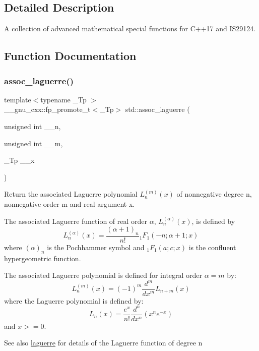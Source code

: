 \subsection{Detailed Description}
A collection of advanced mathematical special functions for C++17 and I\+S29124. 

\subsection{Function Documentation}
\mbox{\label{group__mathsf__std_ga0b33e0ac3066f2353861ce2f34b43f57}} 
\subsubsection{\texorpdfstring{assoc\+\_\+laguerre()}{assoc\_laguerre()}\hspace{0.1cm}{\footnotesize\ttfamily [1/2]}}
{\footnotesize\ttfamily template$<$typename \+\_\+\+Tp $>$ \\
\+\_\+\+\_\+gnu\+\_\+cxx\+::fp\+\_\+promote\+\_\+t$<$\+\_\+\+Tp$>$ std\+::assoc\+\_\+laguerre (\begin{DoxyParamCaption}\item[{unsigned int}]{\+\_\+\+\_\+n,  }\item[{unsigned int}]{\+\_\+\+\_\+m,  }\item[{\+\_\+\+Tp}]{\+\_\+\+\_\+x }\end{DoxyParamCaption})\hspace{0.3cm}{\ttfamily [inline]}}

Return the associated Laguerre polynomial $ L_n^{(m)}(x) $ of nonnegative degree {\ttfamily n}, nonnegative order {\ttfamily m} and real argument {\ttfamily x}.

The associated Laguerre function of real order $ \alpha $, $ L_n^{(\alpha)}(x) $, is defined by \[ L_n^{(\alpha)}(x) = \frac{(\alpha + 1)_n}{n!} {}_1F_1(-n; \alpha + 1; x) \] where $ (\alpha)_n $ is the Pochhammer symbol and $ {}_1F_1(a; c; x) $ is the confluent hypergeometric function.

The associated Laguerre polynomial is defined for integral order $ \alpha = m $ by\+: \[ L_n^{(m)}(x) = (-1)^m \frac{d^m}{dx^m} L_{n + m}(x) \] where the Laguerre polynomial is defined by\+: \[ L_n(x) = \frac{e^x}{n!} \frac{d^n}{dx^n} (x^ne^{-x}) \] and $ x >= 0 $. \begin{DoxySeeAlso}{See also}
\hyperlink{group__mathsf__std_ga9d7b24a11dad27690387405548973ef9}{laguerre} for details of the Laguerre function of degree {\ttfamily n} 
\end{DoxySeeAlso}

